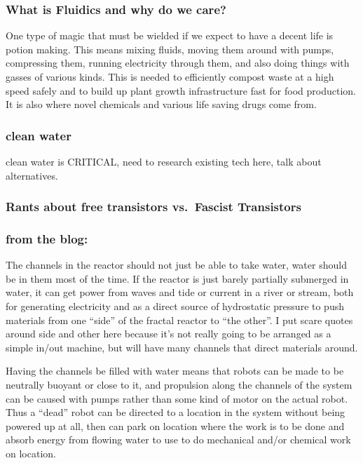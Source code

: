 \subsubsection{What is Fluidics and why do we
care?}\label{what-is-fluidics-and-why-do-we-care}

One type of magic that must be wielded if we expect to have a decent
life is potion making. This means mixing fluids, moving them around with
pumps, compressing them, running electricity through them, and also
doing things with gasses of various kinds. This is needed to efficiently
compost waste at a high speed safely and to build up plant growth
infrastructure fast for food production. It is also where novel
chemicals and various life saving drugs come from.

\subsubsection{clean water}\label{clean-water}

clean water is CRITICAL, need to research existing tech here, talk about
alternatives.

\subsubsection{Rants about free transistors vs.~Fascist
Transistors}\label{rants-about-free-transistors-vs.fascist-transistors}

\subsubsection{from the blog:}\label{from-the-blog}

The channels in the reactor should not just be able to take water, water
should be in them most of the time. If the reactor is just barely
partially submerged in water, it can get power from waves and tide or
current in a river or stream, both for generating electricity and as a
direct source of hydrostatic pressure to push materials from one
``side'' of the fractal reactor to ``the other''. I put scare quotes
around side and other here because it's not really going to be arranged
as a simple in/out machine, but will have many channels that direct
materials around.

Having the channels be filled with water means that robots can be made
to be neutrally buoyant or close to it, and propulsion along the
channels of the system can be caused with pumps rather than some kind of
motor on the actual robot. Thus a ``dead'' robot can be directed to a
location in the system without being powered up at all, then can park on
location where the work is to be done and absorb energy from flowing
water to use to do mechanical and/or chemical work on location.

